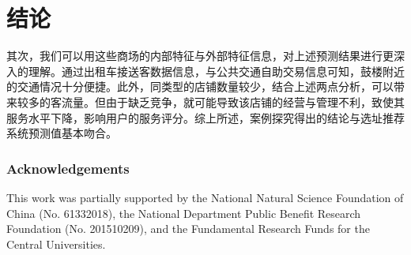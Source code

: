 \documentclass[UTF8]{llncs}
\begin{document}
\section{结论}
其次，我们可以用这些商场的内部特征与外部特征信息，对上述预测结果进行更深入的理解。通过出租车接送客数据信息，与公共交通自助交易信息可知，鼓楼附近的交通情况十分便捷。此外，同类型的店铺数量较少，结合上述两点分析，可以带来较多的客流量。但由于缺乏竞争，就可能导致该店铺的经营与管理不利，致使其服务水平下降，影响用户的服务评分。综上所述，案例探究得出的结论与选址推荐系统预测值基本吻合。

\subsubsection*{Acknowledgements}
This work was partially supported by the National Natural Science Foundation of China (No. 61332018), the National Department Public Benefit Research Foundation (No. 201510209), and the Fundamental Research Funds for the Central Universities.


%

	
\end{document}
